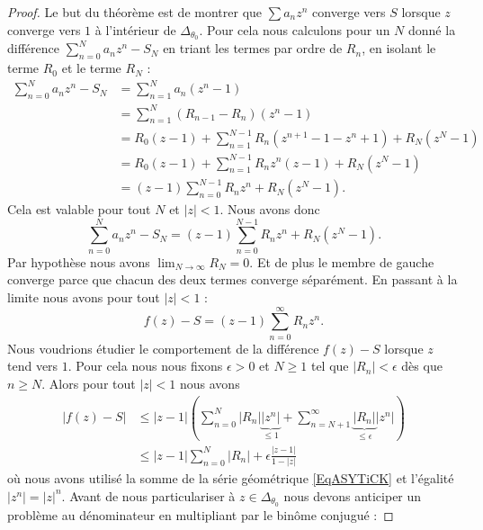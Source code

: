 \begin{proof}
    Le but du théorème est de montrer que \( \sum a_nz^n\) converge vers \( S\) lorsque \( z\) converge vers \( 1\) à l'intérieur de \( \Delta_{\theta_0}\). Pour cela nous calculons pour un \( N\) donné la différence \( \sum_{n=0}^{N}a_nz^n-S_N\) en triant les termes par ordre de \( R_n\), en isolant le terme \( R_0\) et le terme \( R_N\) :
    \begin{subequations}
        \begin{align}
            \sum_{n=0}^Na_nz^n-S_N&=\sum_{n=1}^Na_n(z^n-1)\\
            &=\sum_{n=1}^N(R_{n-1}-R_n)(z^n-1)\\
            &=R_0(z-1)+\sum_{n=1}^{N-1}R_n(z^{n+1}-1-z^n+1)+R_N(z^N-1)\\
            &=R_0(z-1)+\sum_{n=1}^{N-1}R_nz^n(z-1)+R_N(z^N-1)\\
            &=(z-1)\sum_{n=0}^{N-1}R_nz^n+R_N(z^N-1).
        \end{align}
    \end{subequations}
    Cela est valable pour tout \( N\) et \( | z |<1\). Nous avons donc
    \begin{equation}
        \sum_{n=0}^Na_nz^n-S_N=(z-1)\sum_{n=0}^{N-1}R_nz^n+R_N(z^N-1).
    \end{equation}
    Par hypothèse nous avons \( \lim_{N\to \infty} R_N=0\). Et de plus le membre de gauche converge parce que chacun des deux termes converge séparément. En passant à la limite nous avons pour tout \( | z |<1\) :
    \begin{equation}
        f(z)-S=(z-1)\sum_{n=0}^{\infty}R_nz^n.
    \end{equation}
    Nous voudrions étudier le comportement de la différence \( f(z)-S\) lorsque \( z\) tend vers \( 1\). Pour cela nous nous fixons \( \epsilon>0\) et \( N\geq 1\) tel que \( | R_n |<\epsilon\) dès que \( n\geq N\). Alors pour tout \( | z |<1\) nous avons
    \begin{subequations}
        \begin{align}
            | f(z)-S |&\leq | z-1 |\left( \sum_{n=0}^N| R_n | \underbrace{|z^n |}_{\leq 1} +\sum_{n=N+1}^{\infty}\underbrace{| R_n |}_{\leq \epsilon} |z^n | \right)\\
            &\leq | z-1 |\sum_{n=0}^N| R_n |+\epsilon\frac{ | z-1 | }{ 1-| z | }
        \end{align}
    \end{subequations}
    où nous avons utilisé la somme de la série géométrique \eqref{EqASYTiCK} et l'égalité \( | z^n |=| z |^n\). Avant de nous particulariser à \( z\in\Delta_{\theta_0}\) nous devons anticiper un problème au dénominateur en multipliant par le binôme conjugué :

\end{proof}

